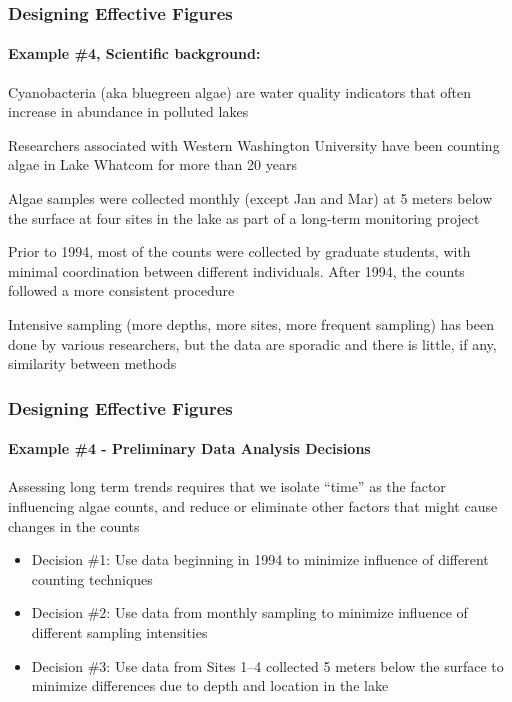 \documentclass[10pt]{beamer}
\newcommand{\bi}{\begin{itemize}}
\newcommand{\ei}{\end{itemize}}
\begin{document}
\begin{frame}
\frametitle{Designing Effective Figures}
\framesubtitle{Example \#4, Scientific background:}

  \bi
\item Cyanobacteria (aka bluegreen algae) are water quality indicators
  that often increase in abundance in polluted lakes

\vspace{1ex}
\item Researchers associated with Western Washington University have
been counting algae in Lake Whatcom for more than 20 years

\vspace{1ex}
\item Algae samples were collected monthly (except Jan and Mar) at 5 meters
  below the surface at four sites in the lake as part of a long-term
  monitoring project

\bi
{\scriptsize
\item Prior to 1994, most of the counts were collected by graduate students,
  with minimal coordination between different individuals.  After 1994, the
  counts followed a more consistent procedure\\}
\ei

\vspace{1ex}
\item Intensive sampling (more depths, more sites, more frequent sampling) has
  been done by various researchers, but the data are sporadic and there is
  little, if any, similarity between methods
\ei

\end{frame}


\begin{frame}
\frametitle{Designing Effective Figures}
\framesubtitle{Example \#4 - Preliminary Data Analysis Decisions}

Assessing long term trends requires that we isolate ``time'' as the
factor influencing algae counts, and reduce or eliminate other factors
that might cause changes in the counts

\bi
\item {\color{red} Decision \#1:}  Use data beginning in 1994 to minimize
  influence of different counting techniques

\vspace{1ex}
\item {\color{red} Decision \#2:}  Use data from monthly sampling
  to minimize influence of different sampling intensities

\vspace{1ex}
\item {\color{red} Decision \#3:} Use data from Sites 1--4 collected 5 meters
  below the surface to minimize differences due to depth and location in the lake
\ei

\end{frame}
\end{document}
